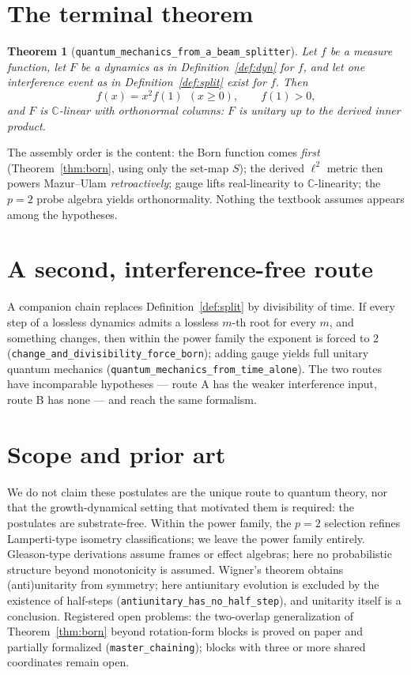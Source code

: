 \documentclass[11pt]{article}
\newtheorem{theorem}{Theorem}[section]
\newcommand{\C}{\mathbb{C}}
\begin{document}
\section{The terminal theorem}\label{sec:terminal}

\begin{theorem}[\texttt{quantum\_mechanics\_from\_a\_beam\_splitter}]
\label{thm:terminal}
Let $f$ be a measure function, let $F$ be a dynamics as in
Definition~\ref{def:dyn} for $f$, and let one interference event as in
Definition~\ref{def:split} exist for $f$.  Then
\[
f(x)=x^2f(1)\ \ (x\ge0),\qquad f(1)>0,
\]
and $F$ is $\C$-linear with orthonormal columns: $F$ is unitary up to
the derived inner product.
\end{theorem}

The assembly order is the content: the Born function comes
\emph{first} (Theorem~\ref{thm:born}, using only the set-map $S$); the
derived $\ell^2$ metric then powers Mazur--Ulam \emph{retroactively};
gauge lifts real-linearity to $\C$-linearity; the $p=2$ probe algebra
yields orthonormality.  Nothing the textbook assumes appears among the
hypotheses.

\section{A second, interference-free route}\label{sec:routeB}

A companion chain replaces Definition~\ref{def:split} by divisibility
of time.  If every step of a lossless dynamics admits a lossless
$m$-th root for every $m$, and something changes, then within the
power family the exponent is forced to $2$
(\texttt{change\_and\_divisibility\_force\_born}); adding gauge yields
full unitary quantum mechanics
(\texttt{quantum\_mechanics\_from\_time\_alone}).  The two routes have
incomparable hypotheses --- route A has the weaker interference input,
route B has none --- and reach the same formalism.

\section{Scope and prior art}\label{sec:scope}

We do not claim these postulates are the unique route to quantum
theory, nor that the growth-dynamical setting that motivated them is
required: the postulates are substrate-free.  Within the power family,
the $p=2$ selection refines Lamperti-type isometry classifications; we
leave the power family entirely.  Gleason-type derivations assume
frames or effect algebras; here no probabilistic structure beyond
monotonicity is assumed.  Wigner's theorem obtains (anti)unitarity
from symmetry; here antiunitary evolution is excluded by the existence
of half-steps (\texttt{antiunitary\_has\_no\_half\_step}), and
unitarity itself is a conclusion.  Registered open problems: the
two-overlap generalization of Theorem~\ref{thm:born} beyond
rotation-form blocks is proved on paper and partially formalized
(\texttt{master\_chaining}); blocks with three or more shared
coordinates remain open.
\end{document}
